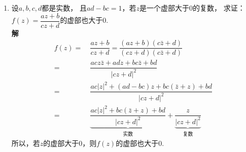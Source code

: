 \begin{enumerate}[label={【\textbf{例\thechapter.\arabic*}】},
 leftmargin=\inteval{\myenumleftmargin}pt,
 itemsep=\inteval{\myenumitempsep}pt,
 itemindent=\inteval{\myenumitemindent}pt]
\item \label{ad-bc=1分式线性变换例题}设$a,b,c,d$都是实数，
且$ad-bc=1$，若$z$是一个虚部大于0的复数，
求证：$f(z)=\dfrac{az+b}{cz+d}$的虚部也大于0. \\
\textbf{解}\ 
\begin{align*}
    f(z) =&\ \dfrac{az+b}{cz+d}=
    \dfrac{(az+b)(c\bar{z}+d)}{(cz+d)(c\bar{z}+d)} \\
    =&\ \dfrac{acz\bar{z}+adz+bc\bar{z}+bd}{|cz+d|^2} \\
    =&\ \dfrac{ac|z|^2+(ad-bc)z+bc(\bar{z}+z)+bd}{|cz+d|^2} \\
    =&\ \underbrace{\dfrac{ac|z|^2+bc(\bar{z}+z)+bd}
        {|cz+d|^2}}_{\text{实数}} +
    \underbrace{\dfrac{z}{|cz+d|^2}}_{\text{复数}}    
\end{align*}
所以，若$z$的虚部大于0，则$f(z)$的虚部也大于0.


\end{enumerate}
